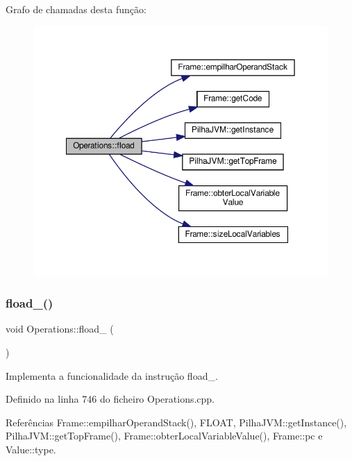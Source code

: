 Grafo de chamadas desta função\+:\nopagebreak
\begin{figure}[H]
\begin{center}
\leavevmode
\includegraphics[width=350pt]{classOperations_af6204248b38b7e6af3a4a6d0f805d79f_cgraph}
\end{center}
\end{figure}
\mbox{\label{classOperations_a844c8a8d812c4f78c8f1024bbdac0548}} 
\subsubsection{\texorpdfstring{fload\+\_()}{fload\_0()}}
{\footnotesize\ttfamily void Operations\+::fload\+\_ (\begin{DoxyParamCaption}{ }\end{DoxyParamCaption})\hspace{0.3cm}{\ttfamily [private]}}



Implementa a funcionalidade da instrução fload\+\_. 



Definido na linha 746 do ficheiro Operations.\+cpp.



Referências Frame\+::empilhar\+Operand\+Stack(), F\+L\+O\+AT, Pilha\+J\+V\+M\+::get\+Instance(), Pilha\+J\+V\+M\+::get\+Top\+Frame(), Frame\+::obter\+Local\+Variable\+Value(), Frame\+::pc e Value\+::type.



